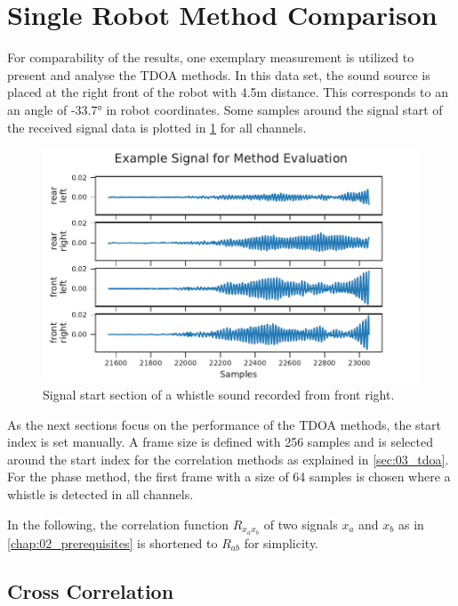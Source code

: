 \section{Single Robot Method Comparison}
\label{sec:04_tdoaSingle}

For comparability of the results, one exemplary measurement is utilized
to present and analyse the \ac{TDOA} methods.
In this data set, the sound source is placed at the right front
of the robot with 4.5\si{m} distance.
This corresponds to an an angle of -33.7\si{\degree} in robot coordinates.
Some samples around the signal start of the received signal data
is plotted in \ref{fig:04_tdoaSignal} for all channels.
\begin{figure}[ht]
	\centering
		\includegraphics[]{figures/evaluation/cc_frontRight_1_signal}
	\caption{Signal start section of a whistle sound recorded from front right.}
	\label{fig:04_tdoaSignal}
\end{figure}

As the next sections focus on the performance of the \ac{TDOA} methods,
the start index is set manually.
A frame size is defined with 256 samples and is selected around the start index for
the correlation methods as explained in \cref{sec:03_tdoa}.
For the phase method, the first frame with a size of 64 samples
is chosen where a whistle is detected in all channels.

In the following, the correlation function $R_{x_ax_b}$ of two signals
$x_a$ and $x_b$ as in \cref{chap:02_prerequisites} is shortened
to $R_{ab}$ for simplicity.


\subsection{Cross Correlation}
\label{subsec:04_ccSingle}


